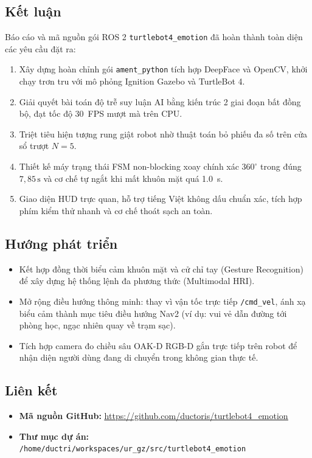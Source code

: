 \subsection{Kết luận}
Báo cáo và mã nguồn gói ROS 2 \texttt{turtlebot4\_emotion} đã hoàn thành toàn diện các yêu cầu đặt ra:
\begin{enumerate}
    \item Xây dựng hoàn chỉnh gói \texttt{ament\_python} tích hợp DeepFace và OpenCV, khởi chạy trơn tru với mô phỏng Ignition Gazebo và TurtleBot 4.
    \item Giải quyết bài toán độ trễ suy luận AI bằng kiến trúc 2 giai đoạn bất đồng bộ, đạt tốc độ \SI{30}{FPS} mượt mà trên CPU.
    \item Triệt tiêu hiện tượng rung giật robot nhờ thuật toán bỏ phiếu đa số trên cửa sổ trượt $N=5$.
    \item Thiết kế máy trạng thái FSM non-blocking xoay chính xác $360^\circ$ trong đúng $7{,}85\,\text{s}$ và cơ chế tự ngắt khi mất khuôn mặt quá \SI{1.0}{\second}.
    \item Giao diện HUD trực quan, hỗ trợ tiếng Việt không dấu chuẩn xác, tích hợp phím kiểm thử nhanh và cơ chế thoát sạch an toàn.
\end{enumerate}

\subsection{Hướng phát triển}
\begin{itemize}
    \item Kết hợp đồng thời biểu cảm khuôn mặt và cử chỉ tay (Gesture Recognition) để xây dựng hệ thống lệnh đa phương thức (Multimodal HRI).
    \item Mở rộng điều hướng thông minh: thay vì vận tốc trực tiếp \texttt{/cmd\_vel}, ánh xạ biểu cảm thành mục tiêu điều hướng Nav2 (ví dụ: vui vẻ dẫn đường tới phòng học, ngạc nhiên quay về trạm sạc).
    \item Tích hợp camera đo chiều sâu OAK-D RGB-D gắn trực tiếp trên robot để nhận diện người dùng đang di chuyển trong không gian thực tế.
\end{itemize}

\subsection*{Liên kết}
\begin{itemize}
    \item \textbf{Mã nguồn GitHub:} \href{https://github.com/ductoris/turtlebot4_emotion}{\color{blue!80!black}\underline{https://github.com/ductoris/turtlebot4\_emotion}}
    \item \textbf{Thư mục dự án:} \texttt{/home/ductri/workspaces/ur_gz/src/turtlebot4_emotion}
\end{itemize}
